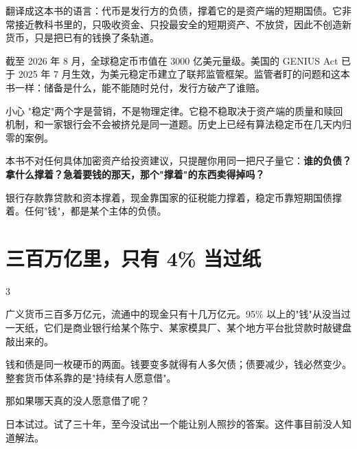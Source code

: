 翻译成这本书的语言：代币是发行方的负债，撑着它的是资产端的短期国债。它非常接近教科书里的，只吸收资金、只投最安全的短期资产、不放贷，因此不创造新货币，只是把已有的钱换了条轨道。

截至 2026 年 8 月，全球稳定币市值在 3000 亿美元量级。美国的 GENIUS Act 已于 2025 年 7 月生效，为美元稳定币建立了联邦监管框架。监管者盯的问题和这本书一样：储备是什么，能不能随时兑付，发行方破产了谁赔。

\begin{warnbox}{小心}
"稳定"两个字是营销，不是物理定律。它稳不稳取决于资产端的质量和赎回机制，和一家银行会不会被挤兑是同一道题。历史上已经有算法稳定币在几天内归零的案例。

本书不对任何具体加密资产给投资建议，只提醒你用同一把尺子量它：\textbf{谁的负债？拿什么撑着？急着要钱的那天，那个"撑着"的东西卖得掉吗？}

\end{warnbox}

银行存款靠贷款和资本撑着，现金靠国家的征税能力撑着，稳定币靠短期国债撑着。任何"钱"，都是某个主体的负债。

\section{三百万亿里，只有 4\% 当过纸}

\begin{statrow}{3}
\end{statrow}

\begin{barfig}
\end{barfig}

广义货币三百多万亿元，流通中的现金只有十几万亿元。95\% 以上的"钱"从没当过一天纸，它们是商业银行给某个陈宁、某家模具厂、某个地方平台批贷款时敲键盘敲出来的。

钱和债是同一枚硬币的两面。钱要变多就得有人多欠债；债要减少，钱必然变少。整套货币体系靠的是"持续有人愿意借"。

那如果哪天真的没人愿意借了呢？

日本试过。试了三十年，至今没试出一个能让别人照抄的答案。这件事目前没人知道解法。

\bookbreak

